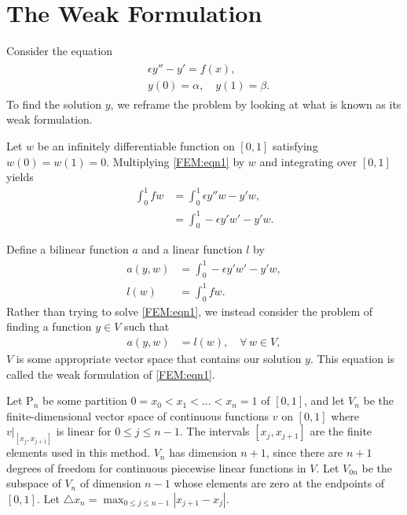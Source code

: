\label{lab:FEM}

\section*{The Weak Formulation}
Consider the equation
\begin{align}
	\begin{split}
	&{ }\epsilon y'' - y' = f(x),\\
	&{ }y(0) = \alpha, \quad y(1) = \beta . 
	\end{split}\label{FEM:eqn1}
\end{align}
To find the solution $y$, we reframe the problem by looking at what is known as its weak formulation. 

Let $w$ be an infinitely differentiable function on $[0,1]$ satisfying
$w(0) = w(1) = 0$. Multiplying \eqref{FEM:eqn1} by $w$ and integrating over $[0,1]$ yields
\begin{align*}
	\int_0^1 f w &= \int_0^1 \epsilon y''w - y'w, \\
	&= \int_0^1 -\epsilon y'w' - y'w.
\end{align*}

Define a bilinear function $a$ and a linear function $l$ by 
\begin{align*}
a(y,w) &= \int_0^1 -\epsilon y'w' - y'w,\\ 
l(w) &= \int_0^1 f w.
\end{align*}
Rather than trying to solve \eqref{FEM:eqn1}, we instead consider the problem of finding a function $y \in V$ such that 
\begin{align}
	a(y,w) &= l(w), \quad \forall \, w \in V,
	\label{FEM:integral_form}
\end{align}
$V$ is some appropriate vector space that contains our solution $y$. This equation 
is called the weak formulation of \eqref{FEM:eqn1}.




Let $\mathrm{P}_n$ be some partition $0 = x_0 < x_1< \ldots < x_{n} = 1$ of $[0,1]$, and let $V_n$ be the finite-dimensional vector space of continuous functions $v$ on $[0,1]$ where $v|_{[{x_j,x_{j+1}}]}$ is linear for $0 \leq j \leq n-1$. The intervals $[{x_j,x_{j+1}}]$ are the finite elements used in this method.  $V_n$ has dimension $n+1$, since there are $n+1$ degrees of freedom for continuous piecewise linear functions in $V$. Let $V_{0n}$ be the subspace of $V_n$ of dimension $n-1$ whose elements are zero at the endpoints of $[0,1]$. 
Let $\triangle x_n = \max_{0 \leq j \leq n-1}|x_{j+1} - x_j|$. 

